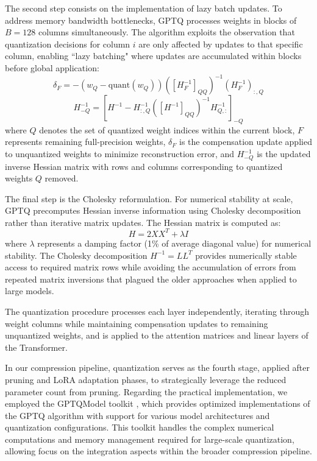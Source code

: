 The second step consists on the implementation of lazy batch updates. To address memory bandwidth bottlenecks, GPTQ processes weights in blocks of $B=128$ columns simultaneously. The algorithm exploits the observation that quantization decisions for column $i$ are only affected by updates to that specific column, enabling ``lazy batching" where updates are accumulated within blocks before global application:
\begin{equation}
\delta_F = -(w_Q - \text{quant}(w_Q))([H_F^{-1}]_{QQ})^{-1}(H_F^{-1})_{:,Q}
\end{equation}
\begin{equation}
H_{-Q}^{-1} = \left[H^{-1} - H_{:,Q}^{-1}([H^{-1}]_{QQ})^{-1}H_{Q,:}^{-1}\right]_{-Q}
\end{equation}
where $Q$ denotes the set of quantized weight indices within the current block, $F$ represents remaining full-precision weights, $\delta_F$ is the compensation update applied to unquantized weights to minimize reconstruction error, and $H_{-Q}^{-1}$ is the updated inverse Hessian matrix with rows and columns corresponding to quantized weights $Q$ removed.

The final step is the Cholesky reformulation. For numerical stability at scale, GPTQ precomputes Hessian inverse information using Cholesky decomposition rather than iterative matrix updates. The Hessian matrix is computed as:
\begin{equation}
H = 2XX^T + \lambda I
\end{equation}
where $\lambda$ represents a damping factor (1\% of average diagonal value) for numerical stability. The Cholesky decomposition $H^{-1} = LL^T$ provides numerically stable access to required matrix rows while avoiding the accumulation of errors from repeated matrix inversions that plagued the older approaches when applied to large models.

The quantization procedure processes each layer independently, iterating through weight columns while maintaining compensation updates to remaining unquantized weights, and is applied to the attention matrices and linear layers of the Transformer.

In our compression pipeline, quantization serves as the fourth stage, applied after pruning and LoRA adaptation phases, to strategically leverage the reduced parameter count from pruning. Regarding the practical implementation, we employed the GPTQModel toolkit \cite{gptqmodel}, which provides optimized implementations of the GPTQ algorithm with support for various model architectures and quantization configurations. This toolkit handles the complex numerical computations and memory management required for large-scale quantization, allowing focus on the integration aspects within the broader compression pipeline.

